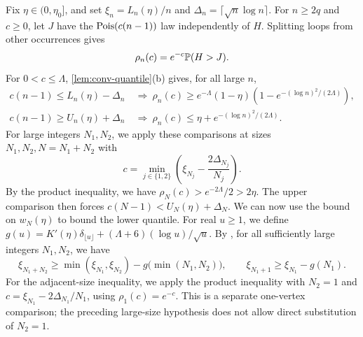 Fix $\eta \in (0, \eta_0]$, and set $\xi_n = L_n(\eta)/n$ and $\Delta_n = \lceil\sqrt n\log n\rceil$. For $n \ge 2q$ and $c \ge 0$, let $J$ have the $\operatorname{Pois}(c(n - 1))$ law independently of $H$. Splitting loops from other occurrences gives
\[
\rho_n(c) = e^{-c}\mathbb P(H > J).
\]
For $0 < c \le \Lambda$, \cref{lem:conv-quantile}(b) gives, for all large $n$,
\[
\begin{aligned}
c(n - 1) \le L_n(\eta) - \Delta_n&\ \Longrightarrow\ \rho_n(c) \ge e^{-\Lambda}(1 - \eta)(1 - e^{-(\log n)^2/(2\Lambda)}), \\
c(n - 1) \ge U_n(\eta) + \Delta_n&\ \Longrightarrow\ \rho_n(c) \le \eta + e^{-(\log n)^2/(2\Lambda)}.
\end{aligned}
\]
For large integers $N_1, N_2$, we apply these comparisons at sizes $N_1, N_2, N = N_1 + N_2$ with
\[
c = \min_{j \in \{1, 2\}}\left(\xi_{N_j} - \frac{2\Delta_{N_j}}{N_j}\right).
\]
By the product inequality, we have $\rho_N(c) > e^{-2\Lambda}/2 > 2\eta$. The upper comparison then forces $c(N - 1) < U_N(\eta) + \Delta_N$. We can now use the bound on $w_N(\eta)$ to bound the lower quantile. For real $u \ge 1$, we define $g(u) = K'(\eta)\delta_{\lfloor u\rfloor} + (\Lambda + 6)(\log u)/\sqrt u$. By , for all sufficiently large integers $N_1, N_2$, we have
\begin{equation}\label{eq:ov-superadd}
\xi_{N_1 + N_2} \ge \min(\xi_{N_1}, \xi_{N_2}) - g\bigl(\min(N_1, N_2)\bigr), \qquad \xi_{N_1 + 1} \ge \xi_{N_1} - g(N_1).
\end{equation}
For the adjacent-size inequality, we apply the product inequality with $N_2 = 1$ and $c = \xi_{N_1} - 2\Delta_{N_1}/N_1$, using $\rho_1(c) = e^{-c}$. This is a separate one-vertex comparison; the preceding large-size hypothesis does not allow direct substitution of $N_2 = 1$.

